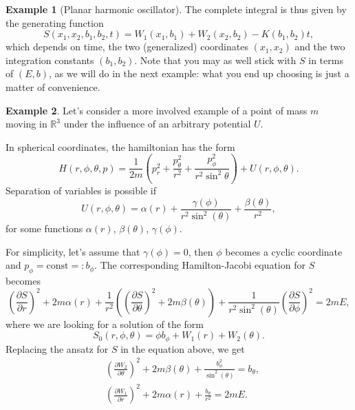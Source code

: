 \documentclass[english,fontsize=11pt,paper=b5]{scrbook}
\numberwithin{equation}{chapter}
\theoremstyle{definition}
\newtheorem{example}{Example}[chapter]
\begin{document}
\begin{example}[Planar harmonic oscillator]
      The complete integral is thus given by the generating function
      \begin{equation}
        S(x_1,x_2,b_1,b_2,t) = W_1(x_1, b_1) + W_2(x_2,b_2) - K(b_1, b_2) t,
      \end{equation}
      which depends on time, the two (generalized) coordinates $(x_1, x_2)$ and the two integration constants $(b_1, b_2)$.
      Note that you may as well stick with $S$ in terms of $(E, b)$, as we will do in the next example: what you end up choosing is just a matter of convenience.
    \end{example}

    \begin{example}\label{ex:kepler3dseparable}
      Let's consider a more involved example of a point of mass $m$ moving in $\mathbb{R}^3$ under the influence of an arbitrary potential $U$.

      In spherical coordinates, the hamiltonian has the form
      \begin{equation}
        H(r,\phi,\theta, p) = \frac{1}{2m}\left(p_r^2 + \frac{p_\theta^2}{r^2} + \frac{p_\phi^2}{r^2\sin^2\theta}\right)
        + U(r,\phi,\theta).
      \end{equation}
      Separation of variables is possible if
      \begin{equation}
        U(r,\phi,\theta) = \alpha(r) + \frac{\gamma(\phi)}{r^2 \sin^2(\theta)} + \frac{\beta(\theta)}{r^2},
      \end{equation}
      for some functions $\alpha(r)$, $\beta(\theta)$, $\gamma(\phi)$.

      For simplicity, let's assume that $\gamma(\phi) = 0$, then $\phi$ becomes a cyclic coordinate and $p_\phi = \mathrm{const} =: b_\phi$.
      The corresponding Hamilton-Jacobi equation for $S$ becomes
      \begin{equation}
        \left(\frac{\partial S}{\partial r}\right)^2 + 2m\alpha(r)
        + \frac{1}{r^2}\left(
          \left(\frac{\partial S}{\partial \theta}\right)^2 + 2m\beta(\theta)
        \right)
        + \frac{1}{r^2\sin^2(\theta)}\left(\frac{\partial S}{\partial \phi}\right)^2 = 2mE,
      \end{equation}
      where we are looking for a solution of the form
      \begin{equation}
        S_0(r,\phi,\theta) = \phi b_\phi + W_1(r) + W_2(\theta).
      \end{equation}
      Replacing the ansatz for $S$ in the equation above, we get
      \begin{align}
     & \left(\frac{\partial W_2}{\partial \theta}\right)^2 + 2m \beta(\theta) + \frac{b_\phi^2}{\sin^2(\theta)} = b_\theta, \\
     & \left(\frac{\partial W_1}{\partial r}\right)^2 + 2m \alpha(r) + \frac{b_\theta}{r^2} = 2mE.
      \end{align}


\end{example}
\end{document}
